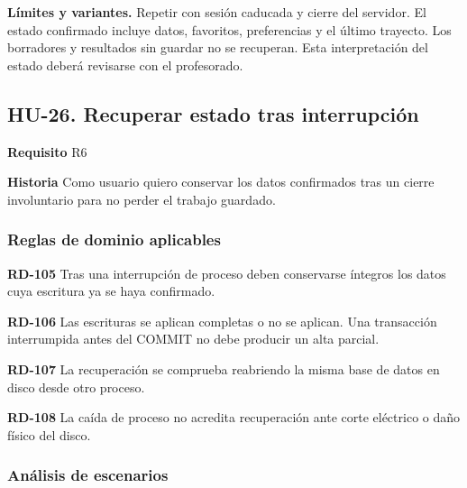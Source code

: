 {\fontsize{9}{11.8}\selectfont\textbf{Límites y variantes.} Repetir con sesión caducada y cierre del servidor. El estado confirmado incluye datos, favoritos, preferencias y el último trayecto. Los borradores y resultados sin guardar no se recuperan. Esta interpretación del estado deberá revisarse con el profesorado.\par}\vspace{4pt}
\clearpage\subsection*{HU-26. Recuperar estado tras interrupción}

\textbf{Requisito} R6\par

\textbf{Historia} Como usuario quiero conservar los datos confirmados tras un cierre involuntario para no perder el trabajo guardado.\par

\subsubsection*{Reglas de dominio aplicables}

\textbf{RD-105} Tras una interrupción de proceso deben conservarse íntegros los datos cuya escritura ya se haya confirmado.\par

\textbf{RD-106} Las escrituras se aplican completas o no se aplican. Una transacción interrumpida antes del COMMIT no debe producir un alta parcial.\par

\textbf{RD-107} La recuperación se comprueba reabriendo la misma base de datos en disco desde otro proceso.\par

\textbf{RD-108} La caída de proceso no acredita recuperación ante corte eléctrico o daño físico del disco.\par


\subsubsection*{Análisis de escenarios}

